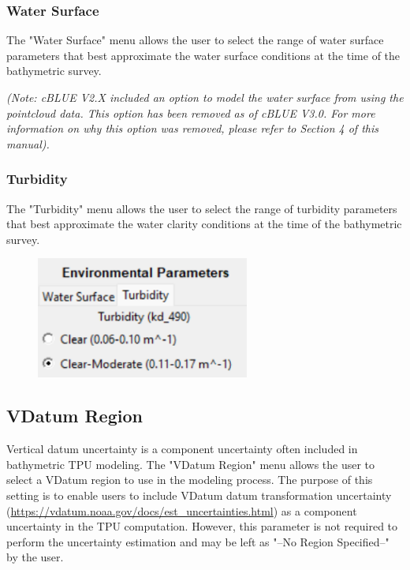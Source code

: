 \documentclass[11pt, a4paper]{article}
\begin{document}
\subsubsection{Water Surface}
The "Water Surface" menu allows the user to select the range of water surface parameters that best approximate the water surface conditions at the time of the bathymetric survey.

\vspace{1em}

\textit{(Note: cBLUE V2.X included an option to model the water surface from using the pointcloud data. This option has been removed as of cBLUE V3.0. For more information on why this option was removed, please refer to Section 4 of this manual).}

\subsubsection{Turbidity}
The "Turbidity" menu allows the user to select the range of turbidity parameters that best approximate the water clarity conditions at the time of the bathymetric survey.

\begin{figure}[H]
    \centering
    \includegraphics[width=7cm]{figs/env_params.png}
\end{figure}

\subsection{VDatum Region}
Vertical datum uncertainty is a component uncertainty often included in bathymetric TPU modeling. The "VDatum Region" menu allows the user to select a VDatum region to use in the modeling process. The purpose of this setting is to enable users to include VDatum datum transformation uncertainty (\url{https://vdatum.noaa.gov/docs/est_uncertainties.html}) as a component uncertainty in the TPU computation.  However, this parameter is not required to perform the uncertainty estimation and may be left as "--No Region Specified--" by the user.
\end{document}
